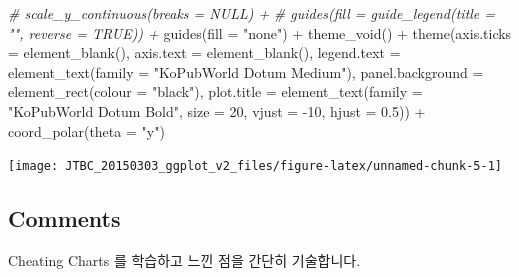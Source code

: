 \documentclass[
]{article}
\newenvironment{Shaded}{\begin{snugshade}}{\end{snugshade}}
\newcommand{\AttributeTok}[1]{\textcolor[rgb]{0.77,0.63,0.00}{#1}}
\newcommand{\CommentTok}[1]{\textcolor[rgb]{0.56,0.35,0.01}{\textit{#1}}}
\newcommand{\DecValTok}[1]{\textcolor[rgb]{0.00,0.00,0.81}{#1}}
\newcommand{\FloatTok}[1]{\textcolor[rgb]{0.00,0.00,0.81}{#1}}
\newcommand{\FunctionTok}[1]{\textcolor[rgb]{0.00,0.00,0.00}{#1}}
\newcommand{\NormalTok}[1]{#1}
\newcommand{\SpecialCharTok}[1]{\textcolor[rgb]{0.00,0.00,0.00}{#1}}
\newcommand{\StringTok}[1]{\textcolor[rgb]{0.31,0.60,0.02}{#1}}
\begin{document}
\begin{Shaded}
\begin{Highlighting}[]
\CommentTok{\#  scale\_y\_continuous(breaks = NULL) +}
\CommentTok{\#  guides(fill = guide\_legend(title = "", reverse = TRUE)) +}
  \FunctionTok{guides}\NormalTok{(}\AttributeTok{fill =} \StringTok{"none"}\NormalTok{) }\SpecialCharTok{+}
  \FunctionTok{theme\_void}\NormalTok{() }\SpecialCharTok{+}
  \FunctionTok{theme}\NormalTok{(}\AttributeTok{axis.ticks =} \FunctionTok{element\_blank}\NormalTok{(),}
        \AttributeTok{axis.text =} \FunctionTok{element\_blank}\NormalTok{(),}
        \AttributeTok{legend.text =} \FunctionTok{element\_text}\NormalTok{(}\AttributeTok{family =} \StringTok{"KoPubWorld Dotum Medium"}\NormalTok{),}
        \AttributeTok{panel.background =} \FunctionTok{element\_rect}\NormalTok{(}\AttributeTok{colour =} \StringTok{"black"}\NormalTok{),}
        \AttributeTok{plot.title =} \FunctionTok{element\_text}\NormalTok{(}\AttributeTok{family =} \StringTok{"KoPubWorld Dotum Bold"}\NormalTok{, }
                                  \AttributeTok{size =} \DecValTok{20}\NormalTok{, }
                                  \AttributeTok{vjust =} \SpecialCharTok{{-}}\DecValTok{10}\NormalTok{,}
                                  \AttributeTok{hjust =} \FloatTok{0.5}\NormalTok{)) }\SpecialCharTok{+}
  \FunctionTok{coord\_polar}\NormalTok{(}\AttributeTok{theta =} \StringTok{"y"}\NormalTok{)}
\end{Highlighting}
\end{Shaded}

\begin{center}\texttt{[image: JTBC\_20150303\_ggplot\_v2\_files/figure-latex/unnamed-chunk-5-1]} \end{center}

\hypertarget{comments}{%
\subsection{Comments}\label{comments}}

Cheating Charts 를 학습하고 느낀 점을 간단히 기술합니다.
\end{document}
